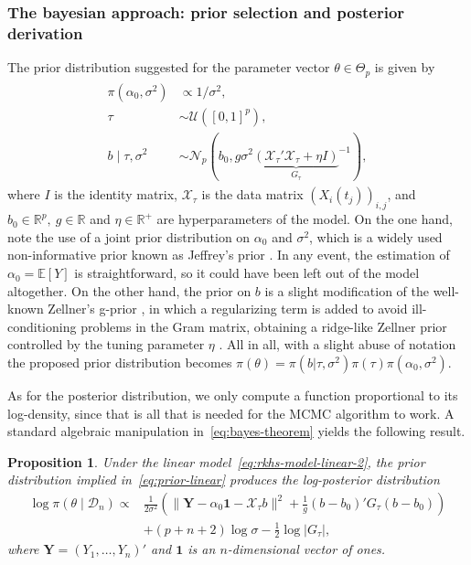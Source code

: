 \documentclass[ba]{imsart}
\numberwithin{equation}{section}
\theoremstyle{plain}
\newtheorem{proposition}{Proposition}[section]
\newcommand{\R}{\mathbb{R}}
\newcommand{\E}{\mathbb{E}}
\begin{document}
\subsubsection{The bayesian approach: prior selection and posterior derivation}

The prior distribution suggested for the parameter vector \(\theta \in \Theta_p\) is given by
\begin{align}\label{eq:prior-linear}
  \begin{split}
  \pi(\alpha_0, \sigma^2)              & \propto 1/\sigma^2,                                                     \\
  \tau                     & \sim \mathcal U([0, 1]^p),                                              \\
  b\mid \tau, \sigma^2 & \sim \mathcal N_p(b_0, g\sigma^2{\underbrace{\left(\mathcal X_\tau' \mathcal X_\tau + \eta I\right)}_{G_\tau}}^{-1}),
\end{split}
\end{align}
where \(I\) is the identity matrix, \(\mathcal X_\tau\) is the data matrix \((X_i(t_j))_{i,j}\), and \(b_0\in \R^p, \ g \in \R\) and \(\eta \in \R^+\) are hyperparameters of the model. On the one hand, note the use of a joint prior distribution on \(\alpha_0\) and \(\sigma^2\), which is a widely used non-informative prior known as Jeffrey's prior \citep{jeffreys1946invariant}. In any event, the estimation of \(\alpha_0=\E[Y]\) is straightforward, so it could have been left out of the model altogether. On the other hand, the prior on \(b\) is a slight modification of the well-known Zellner's g-prior \citep{zellner1986assessing}, in which a regularizing term is added to avoid ill-conditioning problems in the Gram matrix, obtaining a ridge-like Zellner prior controlled by the tuning parameter \(\eta\) \citep{baragatti2012study}. All in all, with a slight abuse of notation the proposed prior distribution becomes \(\pi(\theta) = \pi(b| \tau, \sigma^2)\pi(\tau)\pi(\alpha_0, \sigma^2)\).

As for the posterior distribution, we only compute a function proportional to its log-density, since that is all that is needed for the MCMC algorithm to work. A standard algebraic manipulation in~\eqref{eq:bayes-theorem} yields the following result.

\begin{proposition}
Under the linear model~\eqref{eq:rkhs-model-linear-2}, the prior distribution implied in~\eqref{eq:prior-linear} produces the log-posterior distribution
\begin{align*}
\log \pi(\theta \mid \mathcal D_n) \propto {} & \frac{1}{2\sigma^2}\left(\|\bm Y- \alpha_0\bm{1} - \mathcal X_\tau b\|^2 + \frac{1}{g}(b - b_0)'G_\tau(b - b_0) \right)\\
& + (p+n+2)\log\sigma - \frac{1}{2}\log |G_\tau|,
\end{align*}
where \(\bm Y=(Y_1,\dots,Y_n)'\) and \(\bm{1}\) is an \(n\)-dimensional vector of ones.
\end{proposition}
\end{document}
